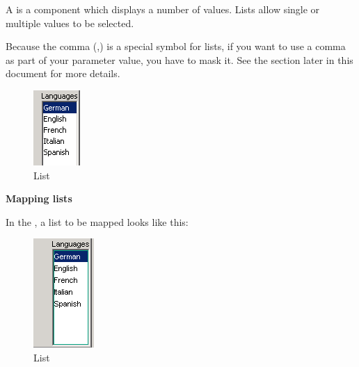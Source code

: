 A  is a component which displays a
number of values. Lists allow single or  multiple values to be selected. 

Because the comma (,) is a special symbol for lists, if you want to use a comma as part of your parameter value, you have to mask it. See the section later in this document  for more details. 

\begin{figure}
\begin{center}
\includegraphics{PS/List}
\caption{List}
\label{list}
\end{center}
\end{figure}

\textbf{Mapping lists}

In the \gdomm{}, a list to be mapped looks like this:

\begin{figure}
\begin{center}
\includegraphics{PS/Maplist}
\caption{List}
\label{maplist}
\end{center}
\end{figure}
